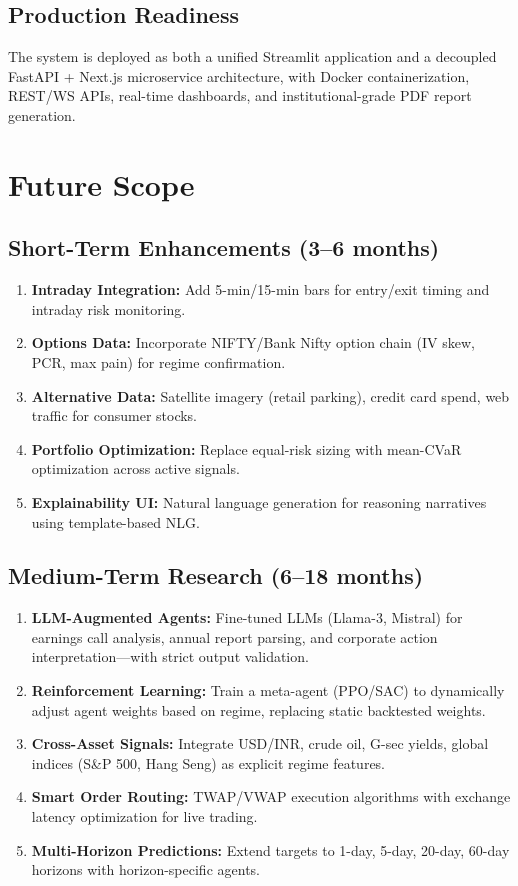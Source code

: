 \documentclass[12pt,a4paper]{report}
\begin{document}
\subsection{Production Readiness}
The system is deployed as both a unified Streamlit application and a decoupled FastAPI + Next.js microservice architecture, with Docker containerization, REST/WS APIs, real-time dashboards, and institutional-grade PDF report generation.

\section{Future Scope}
\subsection{Short-Term Enhancements (3--6 months)}
\begin{enumerate}
\item \textbf{Intraday Integration:} Add 5-min/15-min bars for entry/exit timing and intraday risk monitoring.
\item \textbf{Options Data:} Incorporate NIFTY/Bank Nifty option chain (IV skew, PCR, max pain) for regime confirmation.
\item \textbf{Alternative Data:} Satellite imagery (retail parking), credit card spend, web traffic for consumer stocks.
\item \textbf{Portfolio Optimization:} Replace equal-risk sizing with mean-CVaR optimization across active signals.
\item \textbf{Explainability UI:} Natural language generation for reasoning narratives using template-based NLG.
\end{enumerate}

\subsection{Medium-Term Research (6--18 months)}
\begin{enumerate}
\item \textbf{LLM-Augmented Agents:} Fine-tuned LLMs (Llama-3, Mistral) for earnings call analysis, annual report parsing, and corporate action interpretation---with strict output validation.
\item \textbf{Reinforcement Learning:} Train a meta-agent (PPO/SAC) to dynamically adjust agent weights based on regime, replacing static backtested weights.
\item \textbf{Cross-Asset Signals:} Integrate USD/INR, crude oil, G-sec yields, global indices (S&P 500, Hang Seng) as explicit regime features.
\item \textbf{Smart Order Routing:} TWAP/VWAP execution algorithms with exchange latency optimization for live trading.
\item \textbf{Multi-Horizon Predictions:} Extend targets to 1-day, 5-day, 20-day, 60-day horizons with horizon-specific agents.
\end{enumerate}
\end{document}
